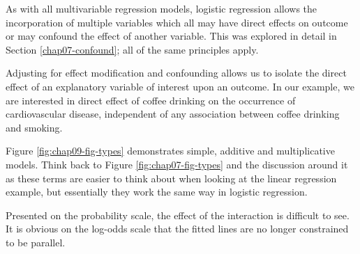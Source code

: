 \documentclass[
  12pt,
  krantz2]{krantz}
\begin{document}
As with all multivariable regression models, logistic regression allows the incorporation of multiple variables which all may have direct effects on outcome or may confound the effect of another variable.
This was explored in detail in Section \ref{chap07-confound}; all of the same principles apply.

Adjusting for effect modification and confounding allows us to isolate the direct effect of an explanatory variable of interest upon an outcome.
In our example, we are interested in direct effect of coffee drinking on the occurrence of cardiovascular disease, independent of any association between coffee drinking and smoking.

Figure \ref{fig:chap09-fig-types} demonstrates simple, additive and multiplicative models.
Think back to Figure \ref{fig:chap07-fig-types} and the discussion around it as these terms are easier to think about when looking at the linear regression example, but essentially they work the same way in logistic regression.

Presented on the probability scale, the effect of the interaction is difficult to see.
It is obvious on the log-odds scale that the fitted lines are no longer constrained to be parallel.
\end{document}
